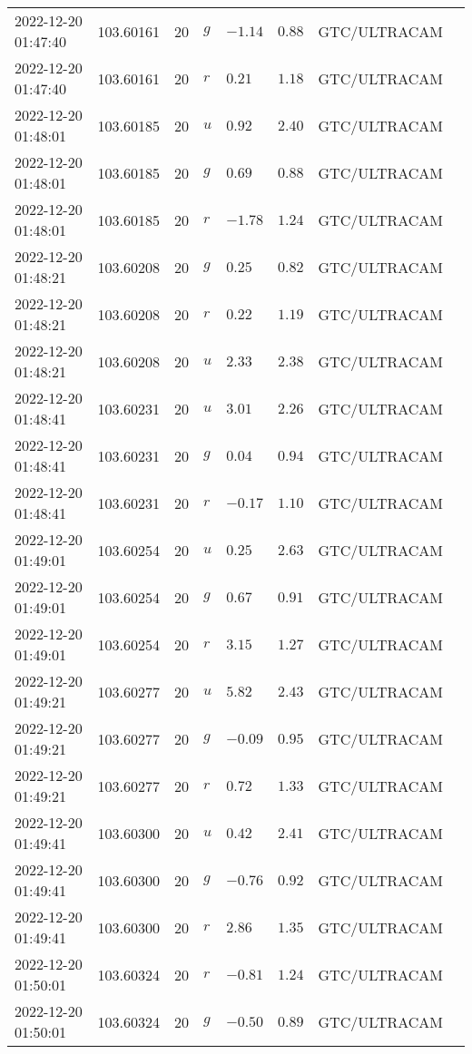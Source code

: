 \documentclass{nature_plusfigure}
\begin{document}
\begin{supplement}
\begin{center}
\begin{longtable}{llllllll}
2022-12-20 01:47:40 & 103.60161 & 20 & $g$ & $-1.14$ & $0.88$ & GTC/ULTRACAM &  \\ 
2022-12-20 01:47:40 & 103.60161 & 20 & $r$ & $0.21$ & $1.18$ & GTC/ULTRACAM &  \\ 
2022-12-20 01:48:01 & 103.60185 & 20 & $u$ & $0.92$ & $2.40$ & GTC/ULTRACAM &  \\ 
2022-12-20 01:48:01 & 103.60185 & 20 & $g$ & $0.69$ & $0.88$ & GTC/ULTRACAM &  \\ 
2022-12-20 01:48:01 & 103.60185 & 20 & $r$ & $-1.78$ & $1.24$ & GTC/ULTRACAM &  \\ 
2022-12-20 01:48:21 & 103.60208 & 20 & $g$ & $0.25$ & $0.82$ & GTC/ULTRACAM &  \\ 
2022-12-20 01:48:21 & 103.60208 & 20 & $r$ & $0.22$ & $1.19$ & GTC/ULTRACAM &  \\ 
2022-12-20 01:48:21 & 103.60208 & 20 & $u$ & $2.33$ & $2.38$ & GTC/ULTRACAM &  \\ 
2022-12-20 01:48:41 & 103.60231 & 20 & $u$ & $3.01$ & $2.26$ & GTC/ULTRACAM &  \\ 
2022-12-20 01:48:41 & 103.60231 & 20 & $g$ & $0.04$ & $0.94$ & GTC/ULTRACAM &  \\ 
2022-12-20 01:48:41 & 103.60231 & 20 & $r$ & $-0.17$ & $1.10$ & GTC/ULTRACAM &  \\ 
2022-12-20 01:49:01 & 103.60254 & 20 & $u$ & $0.25$ & $2.63$ & GTC/ULTRACAM &  \\ 
2022-12-20 01:49:01 & 103.60254 & 20 & $g$ & $0.67$ & $0.91$ & GTC/ULTRACAM &  \\ 
2022-12-20 01:49:01 & 103.60254 & 20 & $r$ & $3.15$ & $1.27$ & GTC/ULTRACAM &  \\ 
2022-12-20 01:49:21 & 103.60277 & 20 & $u$ & $5.82$ & $2.43$ & GTC/ULTRACAM &  \\ 
2022-12-20 01:49:21 & 103.60277 & 20 & $g$ & $-0.09$ & $0.95$ & GTC/ULTRACAM &  \\ 
2022-12-20 01:49:21 & 103.60277 & 20 & $r$ & $0.72$ & $1.33$ & GTC/ULTRACAM &  \\ 
2022-12-20 01:49:41 & 103.60300 & 20 & $u$ & $0.42$ & $2.41$ & GTC/ULTRACAM &  \\ 
2022-12-20 01:49:41 & 103.60300 & 20 & $g$ & $-0.76$ & $0.92$ & GTC/ULTRACAM &  \\ 
2022-12-20 01:49:41 & 103.60300 & 20 & $r$ & $2.86$ & $1.35$ & GTC/ULTRACAM &  \\ 
2022-12-20 01:50:01 & 103.60324 & 20 & $r$ & $-0.81$ & $1.24$ & GTC/ULTRACAM &  \\ 
2022-12-20 01:50:01 & 103.60324 & 20 & $g$ & $-0.50$ & $0.89$ & GTC/ULTRACAM &  \\ 

\end{longtable}
\end{center}
\end{supplement}
\end{document}
